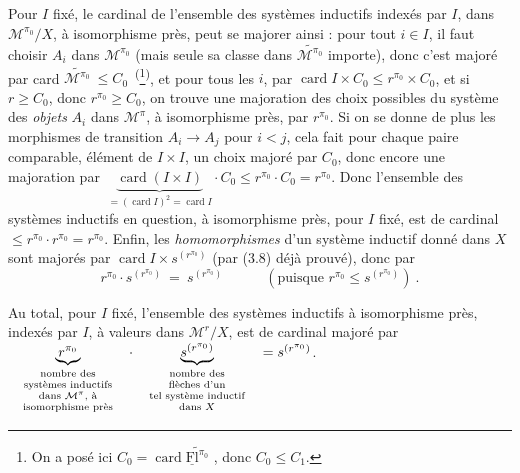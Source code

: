 \documentclass[11pt]{article}
\newcommand{\printedpage}[1]{\marginpar{\footnotesize p.~#1}}
\newcommand{\msp}[1]{\marginpar{\footnotesize [#1]}}
\newcommand{\M}{\mathcal{M}}
\newcommand{\uFl}{\underline{\mathrm{Fl}}}
\newcommand{\card}{\operatorname{card}}
\newcommand{\wavy}[1]{\widetilde{#1}}
\begin{document}
\printedpage{15}
Pour $I$ fixé, le cardinal de l'ensemble des systèmes inductifs indexés par $I$, dans $\M^{\pi_0}/X$, à isomorphisme près, peut se majorer ainsi : pour tout $i\in I$, il faut choisir $A_i$ dans $\M^{\pi_0}$ (mais seule sa classe dans $\wavy{\M^{\pi_0}}$ importe), donc c'est majoré par card $\wavy{\M^{\pi_0}}\ \leq C_0$~\textsuperscript{(}\footnote[7]{On a posé ici $C_0=\card\wavy{\uFl^{\pi_0}}$ , donc $C_0\leq C_1$.}\textsuperscript{)}, et pour tous les $i$, par $\card I\times C_0\leq r^{\pi_0}\times C_0$, et si $r\geq C_0$, donc $r^{\pi_0}\geq C_0$, on trouve une majoration des choix possibles du système des \textit{objets} $A_i$ dans $\M^\pi$, à isomorphisme près, par $r^{\pi_0}$. Si on se donne de plus les morphismes de transition $A_i\longrightarrow A_j$ pour $i<j$, cela fait pour chaque paire comparable, élément de $I\times I$, un choix majoré par $C_0$, donc encore une majoration par $\ \underbrace{\card(I\times I)}_{=(\card I)^2=\card I}\cdot C_0\leq r^{\pi_0}\cdot C_0=r^{\pi_0}$. Donc l'ensemble des systèmes inductifs en question, à isomorphisme près, pour $I$ fixé, est de cardinal $\leq r^{\pi_0}\cdot r^{\pi_0}=r^{\pi_0}$. Enfin, les \textit{homomorphismes} d'un système inductif donné dans $X$ sont majorés par $\card I\times s^{(r^{\pi_0})}$ (par (3.8) déjà prouvé), donc par
\[
r^{\pi_0}\cdot s^{(r^{\pi_0})}\ =\ s^{(r^{\pi_0})}\qquad\quad(\text{puisque } r^{\pi_0}\leq s^{(r^{\pi_0})})\ .
\]

Au total, pour $I$ fixé, l'ensemble des systèmes inductifs à isomorphisme près, indexés par $I$, à valeurs dans $\M^r/X$, est \msp{page 22} de cardinal majoré par $\quad\underbrace{r^{\pi_0}}_{\text{\scriptsize\begin{tabular}{@{}c@{}}nombre des\\ systèmes inductifs\\ dans $\M^\pi$, à\\ isomorphisme près\end{tabular}}}\quad\cdot\quad\underbrace{s^{(r^{\pi_0})}}_{\text{\scriptsize\begin{tabular}{@{}c@{}}nombre des\\ flèches d'un\\ tel système inductif\\ dans $X$\end{tabular}}}\quad=s^{(r^{\pi_0})}$.
\end{document}
